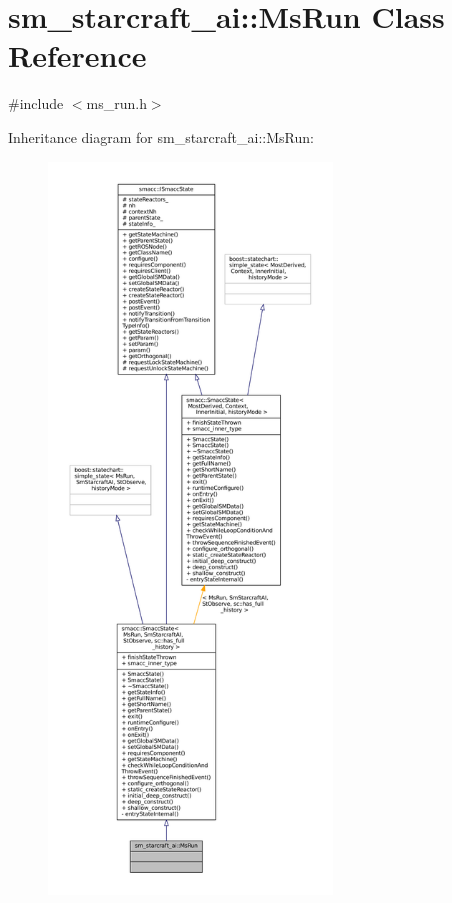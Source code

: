 \hypertarget{classsm__starcraft__ai_1_1MsRun}{}\section{sm\+\_\+starcraft\+\_\+ai\+:\+:Ms\+Run Class Reference}
\label{classsm__starcraft__ai_1_1MsRun}


{\ttfamily \#include $<$ms\+\_\+run.\+h$>$}



Inheritance diagram for sm\+\_\+starcraft\+\_\+ai\+:\+:Ms\+Run\+:
\nopagebreak
\begin{figure}[H]
\begin{center}
\leavevmode
\includegraphics[height=550pt]{classsm__starcraft__ai_1_1MsRun__inherit__graph}
\end{center}
\end{figure}


